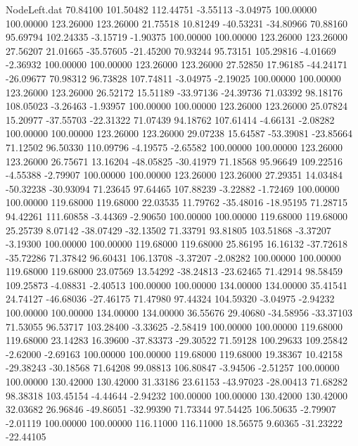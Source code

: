 \begin{filecontents}{NodeLeft.dat}
  70.84100  101.50482  112.44751    -3.55113   -3.04975  100.00000  100.00000  123.26000  123.26000   21.75518   10.81249  -40.53231  -34.80966
  70.88160   95.69794  102.24335    -3.15719   -1.90375  100.00000  100.00000  123.26000  123.26000   27.56207   21.01665  -35.57605  -21.45200
  70.93244   95.73151  105.29816    -4.01669   -2.36932  100.00000  100.00000  123.26000  123.26000   27.52850   17.96185  -44.24171  -26.09677
  70.98312   96.73828  107.74811    -3.04975   -2.19025  100.00000  100.00000  123.26000  123.26000   26.52172   15.51189  -33.97136  -24.39736
  71.03392   98.18176  108.05023    -3.26463   -1.93957  100.00000  100.00000  123.26000  123.26000   25.07824   15.20977  -37.55703  -22.31322
  71.07439   94.18762  107.61414    -4.66131   -2.08282  100.00000  100.00000  123.26000  123.26000   29.07238   15.64587  -53.39081  -23.85664
  71.12502   96.50330  110.09796    -4.19575   -2.65582  100.00000  100.00000  123.26000  123.26000   26.75671   13.16204  -48.05825  -30.41979
  71.18568   95.96649  109.22516    -4.55388   -2.79907  100.00000  100.00000  123.26000  123.26000   27.29351   14.03484  -50.32238  -30.93094
  71.23645   97.64465  107.88239    -3.22882   -1.72469  100.00000  100.00000  119.68000  119.68000   22.03535   11.79762  -35.48016  -18.95195
  71.28715   94.42261  111.60858    -3.44369   -2.90650  100.00000  100.00000  119.68000  119.68000   25.25739    8.07142  -38.07429  -32.13502
  71.33791   93.81805  103.51868    -3.37207   -3.19300  100.00000  100.00000  119.68000  119.68000   25.86195   16.16132  -37.72618  -35.72286
  71.37842   96.60431  106.13708    -3.37207   -2.08282  100.00000  100.00000  119.68000  119.68000   23.07569   13.54292  -38.24813  -23.62465
  71.42914   98.58459  109.25873    -4.08831   -2.40513  100.00000  100.00000  134.00000  134.00000   35.41541   24.74127  -46.68036  -27.46175
  71.47980   97.44324  104.59320    -3.04975   -2.94232  100.00000  100.00000  134.00000  134.00000   36.55676   29.40680  -34.58956  -33.37103
  71.53055   96.53717  103.28400    -3.33625   -2.58419  100.00000  100.00000  119.68000  119.68000   23.14283   16.39600  -37.83373  -29.30522
  71.59128  100.29633  109.25842    -2.62000   -2.69163  100.00000  100.00000  119.68000  119.68000   19.38367   10.42158  -29.38243  -30.18568
  71.64208   99.08813  106.80847    -3.94506   -2.51257  100.00000  100.00000  130.42000  130.42000   31.33186   23.61153  -43.97023  -28.00413
  71.68282   98.38318  103.45154    -4.44644   -2.94232  100.00000  100.00000  130.42000  130.42000   32.03682   26.96846  -49.86051  -32.99390
  71.73344   97.54425  106.50635    -2.79907   -2.01119  100.00000  100.00000  116.11000  116.11000   18.56575    9.60365  -31.23222  -22.44105

\end{filecontents}
